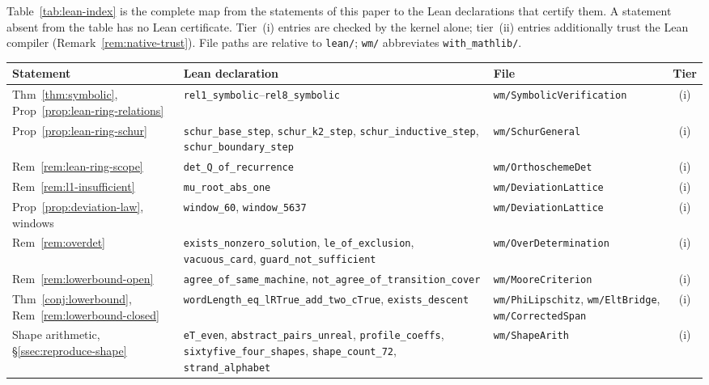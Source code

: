 \documentclass[11pt]{article}
\theoremstyle{plain}
\theoremstyle{definition}
\theoremstyle{remark}
\begin{document}
Table~\ref{tab:lean-index} is the complete map from the statements of this
paper to the Lean declarations that certify them. A statement absent from the
table has no Lean certificate. Tier~(i) entries are checked by the kernel
alone; tier~(ii) entries additionally trust the Lean compiler
(Remark~\ref{rem:native-trust}). File paths are relative to \texttt{lean/};
\texttt{wm/} abbreviates \texttt{with\_mathlib/}.

\begin{table}[htbp]
\centering
\footnotesize
\begin{tabular}{@{}p{}p{}p{}c@{}}
\toprule
Statement & Lean declaration & File & Tier \\
\midrule
Thm~\ref{thm:symbolic}, Prop~\ref{prop:lean-ring-relations}
  & \texttt{rel1\_symbolic}--\texttt{rel8\_symbolic}
  & \texttt{wm/SymbolicVerification} & (i) \\
Prop~\ref{prop:lean-ring-schur}
  & \texttt{schur\_base\_step}, \texttt{schur\_k2\_step},
    \texttt{schur\_inductive\_step}, \texttt{schur\_boundary\_step}
  & \texttt{wm/SchurGeneral} & (i) \\
Rem~\ref{rem:lean-ring-scope}
  & \texttt{det\_Q\_of\_recurrence}
  & \texttt{wm/OrthoschemeDet} & (i) \\
Rem~\ref{rem:l1-insufficient}
  & \texttt{mu\_root\_abs\_one}
  & \texttt{wm/DeviationLattice} & (i) \\
Prop~\ref{prop:deviation-law}, windows
  & \texttt{window\_60}, \texttt{window\_5637}
  & \texttt{wm/DeviationLattice} & (i) \\
Rem~\ref{rem:overdet}
  & \texttt{exists\_nonzero\_solution}, \texttt{le\_of\_exclusion},
    \texttt{vacuous\_card}, \texttt{guard\_not\_sufficient}
  & \texttt{wm/OverDetermination} & (i) \\
Rem~\ref{rem:lowerbound-open}
  & \texttt{agree\_of\_same\_machine},
    \texttt{not\_agree\_of\_transition\_cover}
  & \texttt{wm/MooreCriterion} & (i) \\
Thm~\ref{conj:lowerbound}, Rem~\ref{rem:lowerbound-closed}
  & \texttt{wordLength\_eq\_lRTrue\_add\_two\_cTrue},
    \texttt{exists\_descent}
  & \texttt{wm/PhiLipschitz}, \texttt{wm/EltBridge},
    \texttt{wm/CorrectedSpan} & (i) \\
Shape arithmetic, \S\ref{ssec:reproduce-shape}
  & \texttt{eT\_even}, \texttt{abstract\_pairs\_unreal},
    \texttt{profile\_coeffs}, \texttt{sixtyfive\_four\_shapes},
    \texttt{shape\_count\_72}, \texttt{strand\_alphabet}
  & \texttt{wm/ShapeArith} & (i) \\

\end{tabular}
\end{table}
\end{document}
